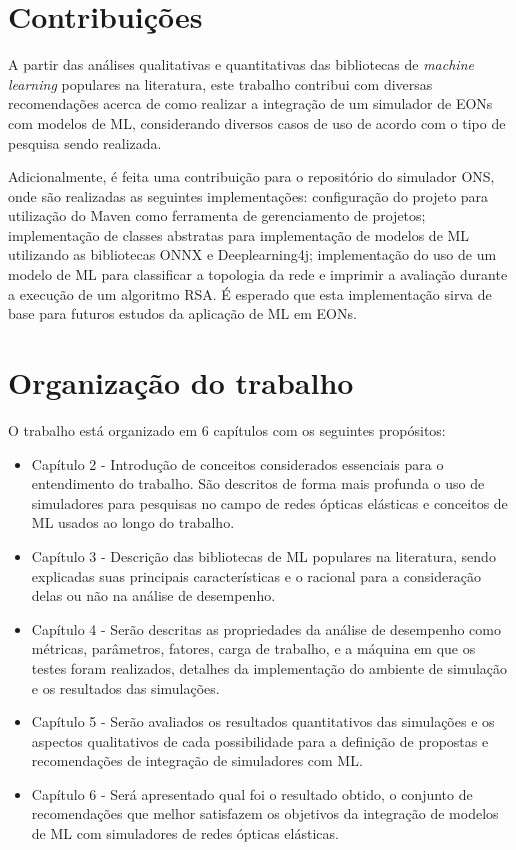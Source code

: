 \section{Contribuições}
\label{intro-contributions}

A partir das análises qualitativas e quantitativas das bibliotecas de \textit{machine learning} populares na literatura, este trabalho contribui com diversas recomendações acerca de como realizar a integração de um simulador de EONs com modelos de ML, considerando diversos casos de uso de acordo com o tipo de pesquisa sendo realizada.

Adicionalmente, é feita uma contribuição para o repositório do simulador ONS, onde são realizadas as seguintes implementações: configuração do projeto para utilização do Maven como ferramenta de gerenciamento de projetos; implementação de classes abstratas para implementação de modelos de ML utilizando as bibliotecas ONNX e Deeplearning4j; implementação do uso de um modelo de ML para classificar a topologia da rede e imprimir a avaliação durante a execução de um algoritmo RSA. É esperado que esta implementação sirva de base para futuros estudos da aplicação de ML em EONs.

\section{Organização do trabalho}
\label{intro-org}

O trabalho está organizado em 6 capítulos com os seguintes propósitos:

\begin{itemize}
  \item Capítulo 2 - Introdução de conceitos considerados essenciais para o entendimento do trabalho. São descritos de forma mais profunda o uso de simuladores para pesquisas no campo de redes ópticas elásticas e conceitos de ML usados ao longo do trabalho.

  \item Capítulo 3 - Descrição das bibliotecas de ML populares na literatura, sendo explicadas suas principais características e o racional para a consideração delas ou não na análise de desempenho.

  \item Capítulo 4 - Serão descritas as propriedades da análise de desempenho como métricas, parâmetros, fatores, carga de trabalho, e a máquina em que os testes foram realizados, detalhes da implementação do ambiente de simulação e os resultados das simulações.

  \item Capítulo 5 - Serão avaliados os resultados quantitativos das simulações e os aspectos qualitativos de cada possibilidade para a definição de propostas e recomendações de integração de simuladores com ML.

  \item Capítulo 6 - Será apresentado qual foi o resultado obtido, o conjunto de recomendações que melhor satisfazem os objetivos da integração de modelos de ML com simuladores de redes ópticas elásticas.
\end{itemize}
